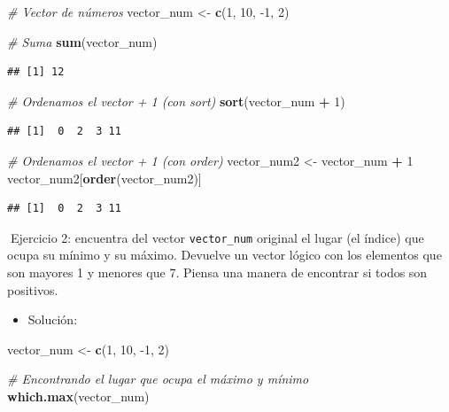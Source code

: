 \documentclass[11pt,]{book}
\newenvironment{Shaded}{\begin{snugshade}}{\end{snugshade}}
\newcommand{\CommentTok}[1]{\textcolor[rgb]{0.37,0.37,0.37}{\textit{#1}}}
\newcommand{\DecValTok}[1]{\textcolor[rgb]{0.06,0.06,0.06}{#1}}
\newcommand{\KeywordTok}[1]{\textcolor[rgb]{0.27,0.27,0.27}{\textbf{#1}}}
\newcommand{\NormalTok}[1]{#1}
\newcommand{\OperatorTok}[1]{\textcolor[rgb]{0.43,0.43,0.43}{\textbf{#1}}}
\newcommand{\StringTok}[1]{\textcolor[rgb]{0.5,0.5,0.5}{#1}}
\providecommand{\tightlist}{%
  \setlength{\itemsep}{0pt}\setlength{\parskip}{0pt}}
\begin{document}
\begin{Shaded}
\begin{Highlighting}[]
\CommentTok{# Vector de números}
\NormalTok{vector_num <-}\StringTok{ }\KeywordTok{c}\NormalTok{(}\DecValTok{1}\NormalTok{, }\DecValTok{10}\NormalTok{, }\DecValTok{-1}\NormalTok{, }\DecValTok{2}\NormalTok{)}

\CommentTok{# Suma}
\KeywordTok{sum}\NormalTok{(vector_num)}
\end{Highlighting}
\end{Shaded}

\begin{verbatim}
## [1] 12
\end{verbatim}

\begin{Shaded}
\begin{Highlighting}[]
\CommentTok{# Ordenamos el vector + 1 (con sort)}
\KeywordTok{sort}\NormalTok{(vector_num }\OperatorTok{+}\StringTok{ }\DecValTok{1}\NormalTok{)}
\end{Highlighting}
\end{Shaded}

\begin{verbatim}
## [1]  0  2  3 11
\end{verbatim}

\begin{Shaded}
\begin{Highlighting}[]
\CommentTok{# Ordenamos el vector + 1 (con order)}
\NormalTok{vector_num2 <-}\StringTok{ }\NormalTok{vector_num }\OperatorTok{+}\StringTok{ }\DecValTok{1}
\NormalTok{vector_num2[}\KeywordTok{order}\NormalTok{(vector_num2)]}
\end{Highlighting}
\end{Shaded}

\begin{verbatim}
## [1]  0  2  3 11
\end{verbatim}

📝Ejercicio 2: encuentra del vector \texttt{vector\_num} original el lugar (el índice) que ocupa su mínimo y su máximo. Devuelve un vector lógico con los elementos que son mayores 1 y menores que 7. Piensa una manera de encontrar si todos son positivos.

\begin{itemize}
\tightlist
\item
  Solución:
\end{itemize}

\begin{Shaded}
\begin{Highlighting}[]
\NormalTok{vector_num <-}\StringTok{ }\KeywordTok{c}\NormalTok{(}\DecValTok{1}\NormalTok{, }\DecValTok{10}\NormalTok{, }\DecValTok{-1}\NormalTok{, }\DecValTok{2}\NormalTok{)}

\CommentTok{# Encontrando el lugar que ocupa el máximo y mínimo}
\KeywordTok{which.max}\NormalTok{(vector_num)}
\end{Highlighting}
\end{Shaded}
\end{document}
